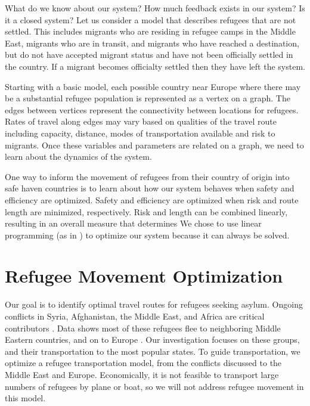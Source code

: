 \documentclass{article}
\begin{document}
    What do we know about our system?
    How much feedback exists in our system? Is it a closed system? 
    Let us consider a model that describes refugees that are not settled. This includes migrants who are residing in refugee camps in the Middle East, migrants who are in transit, and migrants who have reached a destination, but do not have accepted migrant status and have not been officially settled in the country. If a migrant becomes officialty settled then they have left the system. 

    Starting with a basic model, each possible country near Europe where there may be a substantial refugee population is represented as a vertex on a graph. The edges between vertices represent the connectivity between locations for refugees. Rates of travel along edges may vary based on qualities of the travel route including capacity, distance, modes of transportation available and risk to migrants. Once these variables and parameters are related on a graph, we need to learn about the dynamics of the system.

    One way to inform the movement of refugees from their country of origin into safe haven countries is to learn about how our system behaves when safety and efficiency are optimized. Safety and efficiency are optimized when risk and route length are minimized, respectively. Risk and length can be combined linearly, resulting in an overall measure that determines We chose to use linear programming (as in \cite{bertsekas}) to optimize our system because it can always be solved.

\section{Refugee Movement Optimization}

Our goal is to identify optimal travel routes for refugees seeking asylum. Ongoing conflicts in Syria, Afghanistan, the Middle East, and Africa are critical contributors \cite{refugeefactsheet}. Data shows most of these refugees flee to neighboring Middle Eastern countries, and on to Europe \cite{refugeefactsheet}. Our investigation focuses on these groups, and their transportation to the most popular states. To guide transportation, we optimize a refugee transportation model, from the conflicts discussed to the Middle East and Europe. Economically, it is not feasible to transport large numbers of refugees by plane or boat, so we will not address refugee movement in this model.
\end{document}
